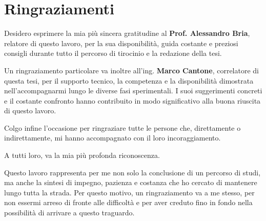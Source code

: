 

\cleardoublepage
{}
\chapter*{\selectfont Ringraziamenti}

\begin{ringraziamentiCalligra}
Desidero esprimere la mia più sincera gratitudine al \textbf{Prof. Alessandro Bria}, relatore di questo lavoro, per la sua disponibilità, guida costante e preziosi consigli durante tutto il percorso di tirocinio e la redazione della tesi. 

Un ringraziamento particolare va inoltre all’ing. \textbf{Marco Cantone}, correlatore di questa tesi, per il supporto tecnico, la competenza e la disponibilità dimostrata nell’accompagnarmi lungo le diverse fasi sperimentali. I suoi suggerimenti concreti e il costante confronto hanno contribuito in modo significativo alla buona riuscita di questo lavoro.  

Colgo infine l’occasione per ringraziare tutte le persone che, direttamente o indirettamente, mi hanno accompagnato con il loro incoraggiamento.

A tutti loro, va la mia più profonda riconoscenza.

Questo lavoro rappresenta per me non solo la conclusione di un percorso di studi, ma anche la sintesi di impegno, pazienza e costanza che ho cercato di mantenere lungo tutta la strada. Per questo motivo, un ringraziamento va a me stesso, per non essermi arreso di fronte alle difficoltà e per aver creduto fino in fondo nella possibilità di arrivare a questo traguardo.
\end{ringraziamentiCalligra}

